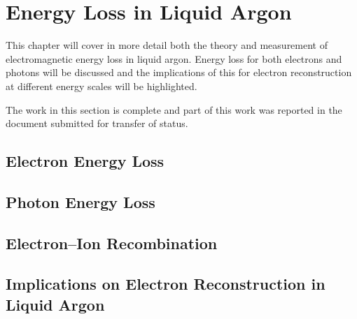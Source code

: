 \chapter{\label{ch:energyloss}Energy Loss in Liquid Argon} 


This chapter will cover in more detail both the theory and measurement of
electromagnetic energy loss in liquid argon. Energy loss for both electrons and
photons will be discussed and the implications of this for electron
reconstruction at different energy scales will be highlighted. 

The work in this section is complete and part of this work was reported in the
document submitted for transfer of status.

\section{Electron Energy Loss}
\section{Photon Energy Loss}
\section{Electron--Ion Recombination}
\section{Implications on Electron Reconstruction in Liquid Argon}
